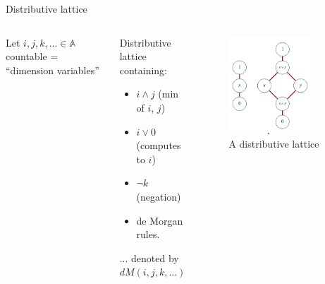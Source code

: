 \documentclass[english,draft]{beamer}
\begin{document}
\begin{frame}{Distributive lattice}
 
%  
%  

 
 
  \begin{columns}[c]
          Let $i, j , k, ... \in \mathbb{A}$ countable = ``dimension variables'' 
 
 \begin{definition}
 Distributive lattice containing:
 
 \begin{itemize}
  \item $i \wedge j$ (min of $i$, $j$)
  \item $i \vee 0$ (computes to $i$)
  \item $\neg k$ (negation)
  \item de Morgan rules.
 
 \end{itemize}

 ... denoted by $dM(i,j,k,...)$
\end{definition}
 

        \begin{figure}
       \includegraphics[width=0.8\textwidth]{figures/lattice}
       \caption{A distributive lattice}
       \end{figure}
\end{columns}
 
 
\end{frame}
\end{document}
